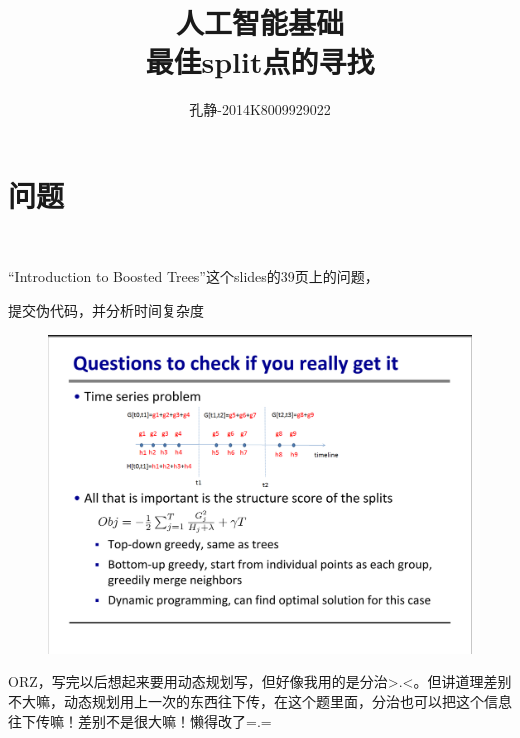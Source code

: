\documentclass{article}
\title{人工智能基础\\最佳split点的寻找}
\author{孔静-2014K8009929022}
\begin{document}
   
	\maketitle
	\section{问题}\
	
		“Introduction to Boosted Trees”这个slides的39页上的问题，
		
		提交伪代码，并分析时间复杂度
		
		\begin{figure}[htp]
			\centering
			\includegraphics[width=12cm]{picture}
			\label{Introduction to Boosted Trees-p39}
		\end{figure}
	
		ORZ，写完以后想起来要用动态规划写，但好像我用的是分治>.<。但讲道理差别不大嘛，动态规划用上一次的东西往下传，在这个题里面，分治也可以把这个信息往下传嘛！差别不是很大嘛！懒得改了=.=
	\newpage
\end{document}
